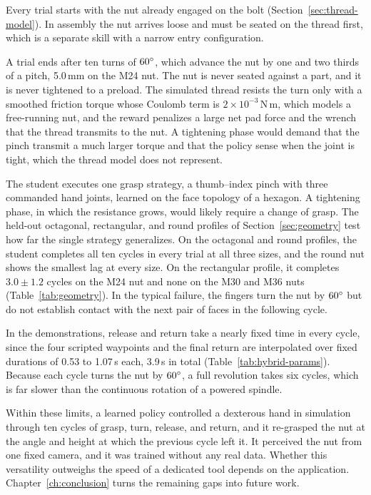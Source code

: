 Every trial starts with the nut already engaged on the bolt (Section~\ref{sec:thread-model}). In assembly the nut arrives loose and must be seated on the thread first, which is a separate skill with a narrow entry configuration.

A trial ends after ten turns of $60^\circ$, which advance the nut by one and two thirds of a pitch, 5.0\,mm on the M24 nut. The nut is never seated against a part, and it is never tightened to a preload.
The simulated thread resists the turn only with a smoothed friction torque whose Coulomb term is $2\times10^{-3}$\,N\,m, which models a free-running nut, and the reward penalizes a large net pad force and the wrench that the thread transmits to the nut. A tightening phase would demand that the pinch transmit a much larger torque and that the policy sense when the joint is tight, which the thread model does not represent.

The student executes one grasp strategy, a thumb--index pinch with three commanded hand joints, learned on the face topology of a hexagon. A tightening phase, in which the resistance grows, would likely require a change of grasp. The held-out octagonal, rectangular, and round profiles of Section~\ref{sec:geometry} test how far the single strategy generalizes. On the octagonal and round profiles, the student completes all ten cycles in every trial at all three sizes, and the round nut shows the smallest lag at every size. On the rectangular profile, it completes $3.0\pm1.2$ cycles on the M24 nut and none on the M30 and M36 nuts (Table~\ref{tab:geometry}). In the typical failure, the fingers turn the nut by $60^\circ$ but do not establish contact with the next pair of faces in the following cycle.

In the demonstrations, release and return take a nearly fixed time in every cycle, since the four scripted waypoints and the final return are interpolated over fixed durations of 0.53 to 1.07\,s each, 3.9\,s in total (Table~\ref{tab:hybrid-params}). Because each cycle turns the nut by $60^\circ$, a full revolution takes six cycles, which is far slower than the continuous rotation of a powered spindle.

Within these limits, a learned policy controlled a dexterous hand in simulation through ten cycles of grasp, turn, release, and return, and it re-grasped the nut at the angle and height at which the previous cycle left it. It perceived the nut from one fixed camera, and it was trained without any real data. Whether this versatility outweighs the speed of a dedicated tool depends on the application. Chapter~\ref{ch:conclusion} turns the remaining gaps into future work.

